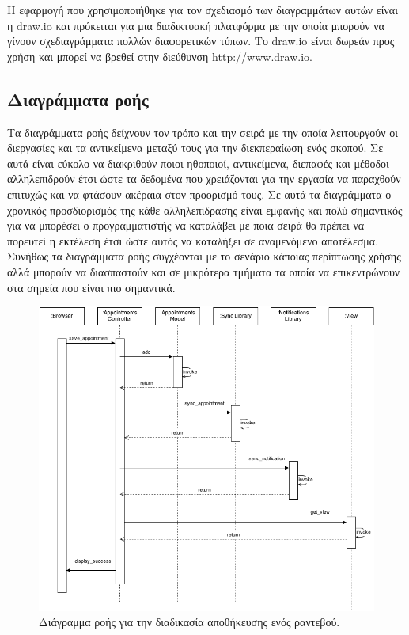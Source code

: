 Η εφαρμογή που χρησιμοποιήθηκε για τον σχεδιασμό των διαγραμμάτων αυτών είναι η draw.io και πρόκειται για μια διαδικτυακή πλατφόρμα με την οποία μπορούν να γίνουν σχεδιαγράμματα πολλών διαφορετικών τύπων. Το draw.io είναι δωρεάν προς χρήση και μπορεί να βρεθεί στην διεύθυνση http://www.draw.io.

\subsection{Διαγράμματα ροής}
Τα διαγράμματα ροής δείχνουν τον τρόπο και την σειρά με την οποία λειτουργούν οι διεργασίες και τα αντικείμενα μεταξύ τους για την διεκπεραίωση ενός σκοπού. Σε αυτά είναι εύκολο να διακριθούν ποιοι ηθοποιοί, αντικείμενα, διεπαφές και μέθοδοι αλληλεπιδρούν έτσι ώστε τα δεδομένα που χρειάζονται για την εργασία να παραχθούν επιτυχώς και να φτάσουν ακέραια στον προορισμό τους. Σε αυτά τα διαγράμματα ο χρονικός προσδιορισμός της κάθε αλληλεπίδρασης είναι εμφανής και πολύ σημαντικός για να μπορέσει ο προγραμματιστής να καταλάβει με ποια σειρά θα πρέπει να πορευτεί η εκτέλεση έτσι ώστε αυτός να καταλήξει σε αναμενόμενο αποτέλεσμα. Συνήθως τα διαγράμματα ροής συγχέονται με το σενάριο κάποιας περίπτωσης χρήσης αλλά μπορούν να διασπαστούν και σε μικρότερα τμήματα τα οποία να επικεντρώνουν στα σημεία που είναι πιο σημαντικά. 

\begin{figure}%
\centering
\includegraphics[width=150mm]{images/sd-save-appointment.png}
\caption{Διάγραμμα ροής για την διαδικασία αποθήκευσης ενός ραντεβού.}
\label{sd-save-appointment}
\end{figure}

